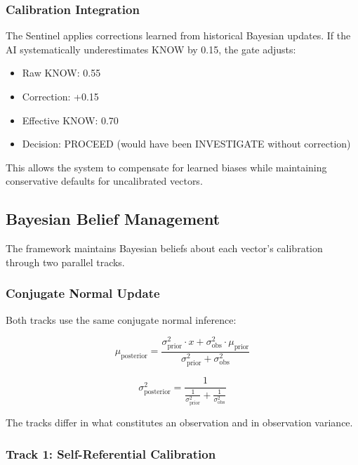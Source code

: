 \subsubsection{Calibration Integration}

The Sentinel applies corrections learned from historical Bayesian updates. If the AI systematically underestimates KNOW by 0.15, the gate adjusts:

\begin{itemize}
    \item Raw KNOW: 0.55
    \item Correction: +0.15
    \item Effective KNOW: 0.70
    \item Decision: PROCEED (would have been INVESTIGATE without correction)
\end{itemize}

This allows the system to compensate for learned biases while maintaining conservative defaults for uncalibrated vectors.

\subsection{Bayesian Belief Management}

The framework maintains Bayesian beliefs about each vector's calibration through two parallel tracks.

\subsubsection{Conjugate Normal Update}

Both tracks use the same conjugate normal inference:

\begin{equation}
\mu_{\text{posterior}} = \frac{\sigma^2_{\text{prior}} \cdot x + \sigma^2_{\text{obs}} \cdot \mu_{\text{prior}}}{\sigma^2_{\text{prior}} + \sigma^2_{\text{obs}}}
\end{equation}

\begin{equation}
\sigma^2_{\text{posterior}} = \frac{1}{\frac{1}{\sigma^2_{\text{prior}}} + \frac{1}{\sigma^2_{\text{obs}}}}
\end{equation}

The tracks differ in what constitutes an observation and in observation variance.

\subsubsection{Track 1: Self-Referential Calibration}

